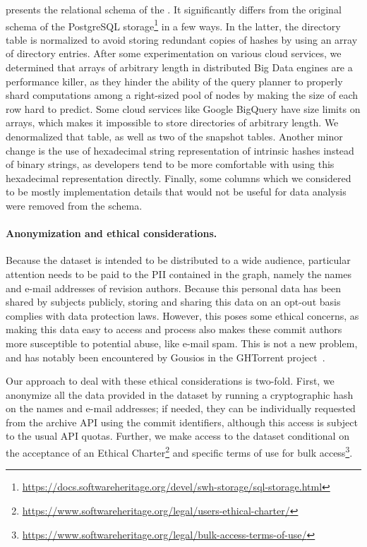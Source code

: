  presents the relational schema of the \SWHGD{}.
It significantly differs from the original schema of the PostgreSQL
storage\footnote{\url{https://docs.softwareheritage.org/devel/swh-storage/sql-storage.html}}
in a few ways. In the latter, the directory table is normalized to avoid storing
redundant copies of hashes by using an array of directory entries. After some
experimentation on various cloud services, we determined that arrays of
arbitrary length in distributed Big Data engines are a performance killer, as
they hinder the ability of the query planner to properly shard computations
among a right-sized pool of nodes by making the size of each row hard to
predict. Some cloud services like Google BigQuery have size limits on arrays,
which makes it impossible to store directories of arbitrary length. We
denormalized that table, as well as two of the snapshot tables. Another minor
change is the use of hexadecimal string representation of intrinsic hashes
instead of binary strings, as developers tend to be more comfortable with using
this hexadecimal representation directly. Finally, some columns which we
considered to be mostly implementation details that would not be useful for
data analysis were removed from the schema.

\paragraph*{Anonymization and ethical considerations.}
Because the dataset is intended to be distributed to a wide audience,
particular attention needs to be paid to the \gls{PII} contained in the graph,
namely the names and e-mail addresses of revision authors. Because this
personal data has been shared by subjects publicly, storing and sharing this
data on an opt-out basis complies with data protection laws. However, this
poses some ethical concerns, as making this data easy to access and process
also makes these commit authors more susceptible to potential abuse, like
e-mail spam. This is not a new problem, and has notably been encountered by
Gousios in the GHTorrent project~\cite{gousios2016issue32}.

Our approach to deal with these ethical considerations is two-fold. First, we
anonymize all the data provided in the dataset by running a cryptographic hash
on the names and e-mail addresses; if needed, they can be individually
requested from the archive API using the commit identifiers, although this
access is subject to the usual API quotas. Further, we make access to the
dataset conditional on the acceptance of an Ethical
Charter\footnote{\url{https://www.softwareheritage.org/legal/users-ethical-charter/}}
and specific terms of use for bulk
access\footnote{\url{https://www.softwareheritage.org/legal/bulk-access-terms-of-use/}}.

